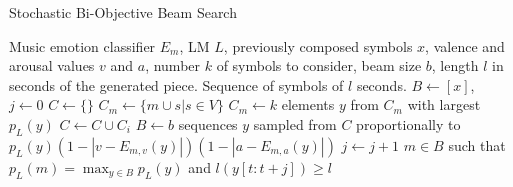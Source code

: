 \begin{algorithm}[!h]
\caption{Stochastic Bi-Objective Beam Search}
\label{alg:sbs}
\begin{algorithmic}[1]
\REQUIRE Music emotion classifier $E_m$, LM $L$, previously composed symbols $x$, valence and arousal values $v$ and $a$, number $k$ of symbols to consider, beam size $b$, length $l$ in seconds of the generated piece.
\ENSURE Sequence of symbols of $l$ seconds.
\STATE $B \gets [x]$, $j \gets 0$ \label{line:sbs:init}
{} \label{line:sbs:stopping_condition}
    \STATE $C \gets \{\}$ \label{line:sbs:init_while}
        \STATE $C_m \gets \{m \cup s \vert s \in V\}$ \label{line:sbs:children}
        \STATE $C_m \gets k$ elements $y$ from $C_m$ with largest $p_L(y)$ \label{line:sbs:pruning_model}
        \STATE $C \gets C \cup C_i$ \label{line:sbs:total_children}
    \ENDFOR
    \STATE $B \gets b$ sequences $y$ sampled from $C$ proportionally to $p_L(y) (1 - |v - E_{m,v}(y)|) (1 - |a - E_{m,a}(y)|)$ \label{line:sbs:sample_next_beam}
    \STATE $j \gets j + 1$ \label{line:sbs:end_while}
\ENDWHILE
\RETURN $m \in B$ such that $p_L(m) = \max_{y \in B}p_L(y)$ and $l(y[t: t+j]) \geq l$ \label{line:sbs:return}
\end{algorithmic}
\end{algorithm}


